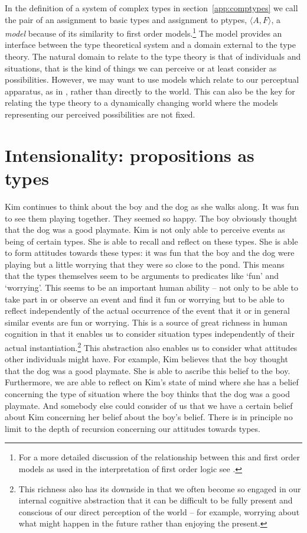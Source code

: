 In the definition of a system of complex types in
section~\ref{app:comptypes}  we call the pair of an assignment to
basic types and assignment to ptypes, $\langle A,F\rangle$, a \textit{model} because of its
similarity to first order models.\footnote{For a more detailed
  discussion of the relationship between this and first order models
  as used in the interpretation of first order logic see
  \cite{Cooperforthcoming}.} The model provides an interface
between 
the type theoretical system and a domain external to the type theory.
The natural domain to relate to the type theory is that of individuals
and situations, that is the kind of things we can perceive or at least
consider as possibilities.  However, we may want to use models which
relate to our perceptual apparatus, as in \cite{Larsson2011}, rather
than directly to the world.  This can also be the key for relating the
type theory to a dynamically changing world where the models
representing our perceived possibilities are not fixed.  %



\section{Intensionality: propositions as types}

Kim continues to think about the boy and the dog as she walks along.
It was fun to see them playing together.  They seemed so happy.  The
boy obviously thought that the dog was a good playmate.  Kim is not
only able to perceive events as being of certain types.  She is able
to recall and reflect on these types.  She is able to form attitudes
towards these types: it was fun that the boy and the dog were playing but
a little worrying that they were so close to the pond.  This means
that the types themselves seem to be arguments to predicates like
`fun' and `worrying'.  This seems to be an important human ability --
not only to be able to take part in or observe an event and find it
fun or worrying but to be able to reflect independently of the actual
occurrence of the event that it or in general similar events are fun
or worrying.  This is a source of great richness in human cognition in
that it enables us to consider situation types independently of their
actual instantiation.\footnote{This richness also has its downside in
  that we often become so engaged in our internal cognitive abstraction
  that it can be difficult to be fully present and conscious of our
  direct perception of the world -- for example, worrying about what
  might happen in the future rather than enjoying the present.}  This
abstraction also enables us to consider what attitudes other
individuals might have.  For example, Kim believes that the boy
thought that the dog was a good playmate.  She is able to ascribe this
belief to the boy.  Furthermore, we are able to reflect on Kim's state
of mind where she has a belief concerning the type of situation where
the boy thinks that the dog was a good playmate.  And somebody else
could consider of us that we have a certain belief about Kim
concerning her belief about the boy's belief.  There
is in principle no limit to the depth of recursion concerning our
attitudes towards types.


